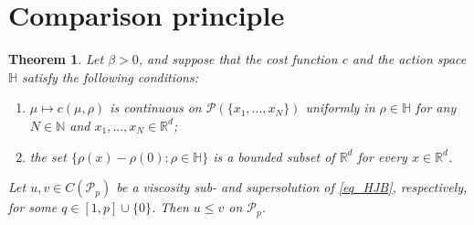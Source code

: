 \documentclass{article}
\newtheorem{theorem}{Theorem}[section]
\theoremstyle{definition}
\numberwithin{equation}{section}
\numberwithin{theorem}{section}
\newcommand{\R}{\mathbb{R}}
\newcommand{\Hb}{\mathbb{H}}
\newcommand{\Nb}{\mathbb{N}}
\newcommand{\Pc}{\mathcal{P}}
\newcommand{\Pcal}{{\mathcal P}}
\begin{document}
\section{Comparison principle}
\label{sec:comparison-principle}

\begin{theorem}\label{T_comparison}
Let $\beta > 0$, and suppose that the cost function $c$ and the action space $\Hb$ satisfy the following conditions:
\begin{enumerate}
\item\label{T_comparison_1} $\mu\mapsto c(\mu,\rho)$ is continuous on $\Pc(\{x_1,...,x_N\})$ uniformly in $\rho\in\Hb$ for any $N\in\Nb$ and $x_1,...,x_N\in {\R^d}$;
\item\label{T_comparison_2} the set $\{\rho(x) - \rho(0) \colon \rho \in \Hb\}$ is a bounded subset of $\R^d$ for every $x \in {\R^d}$.
\end{enumerate}
Let $u,v\in C(\Pcal_p)$ be a viscosity sub- and supersolution of \eqref{eq_HJB}, respectively, for some $q \in [1,p] \cup \{0\}$. Then $u\le v$ on $\Pcal_p$.
\end{theorem}
\end{document}
